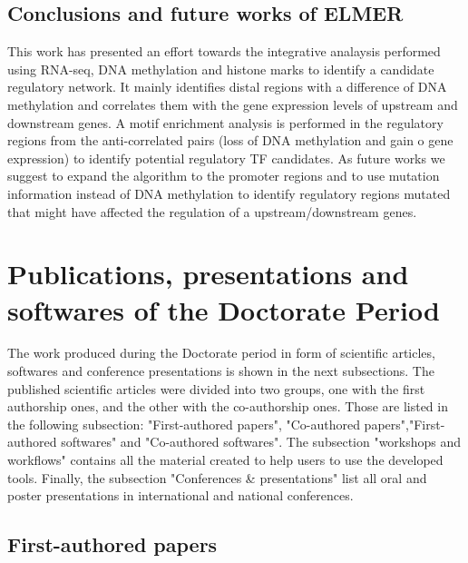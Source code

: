 \subsection{Conclusions and future works of ELMER}

This work has presented an effort towards the integrative analaysis performed
using RNA-seq, DNA methylation and histone marks to identify a candidate regulatory network.
It mainly identifies distal regions with a difference of DNA methylation and correlates them
with the gene expression levels of upstream and downstream genes.
A motif enrichment analysis is performed in the regulatory regions from the anti-correlated
pairs (loss of DNA methylation and gain o gene expression) to identify potential
regulatory TF candidates. As future works we suggest to expand the algorithm to
the promoter regions and to use mutation information instead of DNA methylation
to identify regulatory regions mutated that might have affected the
regulation of a upstream/downstream genes.


\section{Publications, presentations and softwares of the Doctorate Period}

The work produced during the Doctorate period in form of scientific articles,
softwares and conference presentations is shown in the next subsections.
The published scientific articles were divided into two groups, one with the  first authorship ones, and the other with the co-authorship ones. Those are listed in the following subsection: "First-authored papers", "Co-authored papers","First-authored softwares" and "Co-authored softwares".
The subsection "workshops and workflows" contains all the material created to help users to use the developed tools. Finally, the subsection "Conferences \& presentations" list all oral and poster presentations in international and national conferences.

\subsection{First-authored papers}

